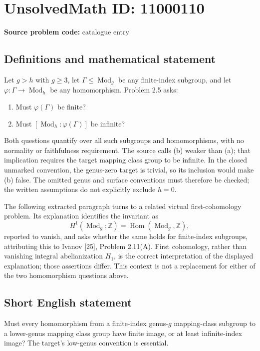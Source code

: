 \documentclass[11pt]{article}
\newcommand{\Z}{\mathbb{Z}}
\begin{document}
\section*{UnsolvedMath ID: 11000110}
\textbf{Source problem code:} catalogue entry
\subsection{Definitions and mathematical statement}
Let $g>h$ with $g\geq3$, let $\Gamma\leq\operatorname{Mod}_g$ be any finite-index subgroup, and let $\varphi:\Gamma\to\operatorname{Mod}_h$ be any homomorphism. Problem 2.5 asks:
\begin{enumerate}
\item[(a)] Must $\varphi(\Gamma)$ be finite?
\item[(b)] Must $[\operatorname{Mod}_h:\varphi(\Gamma)]$ be infinite?
\end{enumerate}
Both questions quantify over all such subgroups and homomorphisms, with no normality or faithfulness requirement. The source calls (b) weaker than (a); that implication requires the target mapping class group to be infinite. In the closed unmarked convention, the genus-zero target is trivial, so its inclusion would make (b) false. The omitted genus and surface conventions must therefore be checked; the written assumptions do not explicitly exclude $h=0$.

The following extracted paragraph turns to a related virtual first-cohomology problem. Its explanation identifies the invariant as
\[
 H^1(\operatorname{Mod}_g;\Z)
 =\operatorname{Hom}(\operatorname{Mod}_g,\Z),
\]
reported to vanish, and asks whether the same holds for finite-index subgroups, attributing this to Ivanov [25], Problem 2.11(A). First cohomology, rather than vanishing integral abelianization $H_1$, is the correct interpretation of the displayed explanation; those assertions differ. This context is not a replacement for either of the two homomorphism questions above.
\subsection{Short English statement}
Must every homomorphism from a finite-index genus-$g$ mapping-class subgroup to a lower-genus mapping class group have finite image, or at least infinite-index image? The target's low-genus convention is essential.
\end{document}
